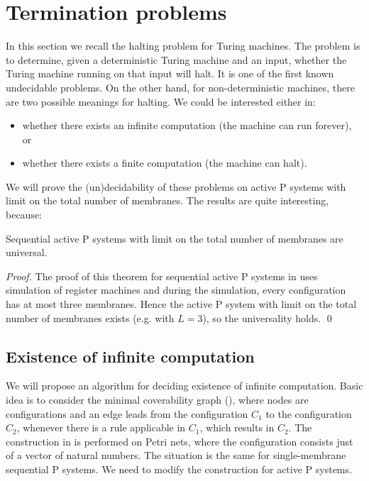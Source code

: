 \documentclass[llncs,submission,copyright,creativecommons]{../lib/lncs/llncs}
\begin{document}
\section{Termination problems} %
\label{sec:termination_problems}

In this section we recall the halting problem for Turing machines. The problem is to determine, given a deterministic Turing machine and an input, whether the Turing machine running on that input will halt. It is one of the first known undecidable problems. On the other hand, for non-deterministic machines, there are two possible meanings for halting. We could be interested either in:
\begin{itemize}
  \item whether there exists an infinite computation (the machine can run forever), or
  \item whether there exists a finite computation (the machine can halt).
\end{itemize}

We will prove the (un)decidability of these problems on active P systems with limit on the total number of membranes. The results are quite interesting, because:

\begin{theorem}
  Sequential active P systems with limit on the total number of membranes are universal.
\end{theorem}

\begin{proof}
  The proof of this theorem for sequential active P systems in \cite{Ibarra05Active} uses simulation of register machines and during the simulation, every configuration has at most three membranes. Hence the active P system with limit on the total number of membranes exists (e.g. with $L=3$), so the universality holds.
  \qed
\end{proof}

\subsection{Existence of infinite computation} %
\label{sub:existence_of_infinite_computation}

We will propose an algorithm for deciding existence of infinite computation. Basic idea is to consider the minimal coverability graph (\cite{Rozenberg93MinimalCoverabilityGraph}), where nodes are configurations and an edge leads from the configuration $C_1$ to the configuration $C_2$, whenever there is a rule applicable in $C_1$, which results in $C_2$. The construction in \cite{Rozenberg93MinimalCoverabilityGraph} is performed on Petri nets, where the configuration consists just of a vector of natural numbers. The situation is the same for single-membrane sequential P systems. We need to modify the construction for active P systems.
\end{document}
